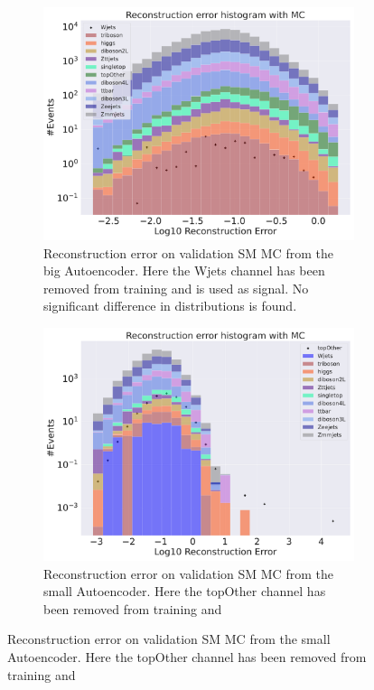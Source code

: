 \begin{figure}[H]
\begin{subfigure}{.45\textwidth}
        \includegraphics[width=\textwidth]{Figures/VAE_testing/big/b_data_recon_big_rm3_feats_sig_Wjets.pdf}
        \caption{Reconstruction error on validation SM MC from the big Autoencoder. Here the Wjets channel has been removed from training and 
        is used as signal. No significant difference in distributions is found. }
        \label{fig:vae_big_Wjets}
    \end{subfigure}
    \hfill 
    \begin{subfigure}{.45\textwidth}
        \includegraphics[width=\textwidth]{Figures/VAE_testing/small/b_data_recon_big_rm3_feats_sig_topOther.pdf}
        \caption{Reconstruction error on validation SM MC from the small Autoencoder. Here the topOther channel has been removed from training and 
}
\end{subfigure}
\end{figure}
